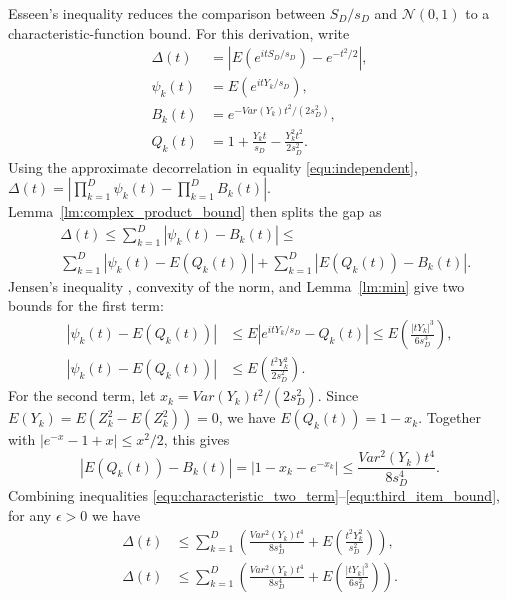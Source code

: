 Esseen's inequality reduces the comparison between $S_D/s_D$ and $\mathcal{N}(0,1)$ to a characteristic-function bound. For this derivation, write
\begin{align}
\Delta(t)&=\left|E(e^{itS_D/s_D})-e^{-t^2/2}\right|,\label{equ:delta_notation}\\
\psi_k(t)&=E(e^{itY_k/s_D}),\label{equ:psi_k_notation}\\
B_k(t)&=e^{-Var(Y_k)t^2/(2s_D^2)},\label{equ:Bk_notation}\\
Q_k(t)&=1+\frac{Y_kt}{s_D}-\frac{Y_k^2t^2}{2s_D^2}.\label{equ:Qk_notation}
\end{align}
Using the approximate decorrelation in equality \ref{equ:independent}, $\Delta(t)=|\prod_{k=1}^{D}\psi_k(t)-\prod_{k=1}^{D}B_k(t)|$. Lemma~\ref{lm:complex_product_bound} then splits the gap as
\begin{equation}
\begin{aligned}
&\Delta(t)\leq \sum_{k=1}^{D}|\psi_k(t)-B_k(t)| \leq {}\\
&\sum_{k=1}^{D}|\psi_k(t)-E(Q_k(t))|
+\sum_{k=1}^{D}|E(Q_k(t))-B_k(t)|.
\end{aligned}
\label{equ:characteristic_two_term}
\end{equation}
Jensen's inequality \cite{mcshane1937jensen}, convexity of the norm, and Lemma~\ref{lm:min} give two bounds for the first term:
\begin{align}
|\psi_k(t)-E(Q_k(t))|
&\leq E|e^{itY_k/s_D}-Q_k(t)|
\leq E\!\left(\frac{|tY_k|^3}{6s_D^3}\right),
\label{equ:first_item_bound}\\
|\psi_k(t)-E(Q_k(t))|
&\leq E\!\left(\frac{t^2Y_k^2}{2s_D^2}\right).
\label{equ:second_item_bound}
\end{align}
For the second term, let $x_k=Var(Y_k)t^2/(2s_D^2)$. Since $E(Y_k)=E(Z_k^2-E(Z_k^2))=0$, we have $E(Q_k(t))=1-x_k$. Together with $|e^{-x}-1+x|\leq x^2/2$, this gives
\begin{equation}
|E(Q_k(t))-B_k(t)|
=|1-x_k-e^{-x_k}|
\leq \frac{Var^2(Y_k)t^4}{8s_D^4}.
\label{equ:third_item_bound}
\end{equation}
Combining inequalities \ref{equ:characteristic_two_term}--\ref{equ:third_item_bound}, for any $\epsilon>0$ we have
\begin{align}
\Delta(t)
&\leq
\sum_{k=1}^{D}\left(
\frac{Var^2(Y_k)t^4}{8s_D^4}
+E\!\left(\frac{t^2Y_k^2}{s_D^2}\right)
\right),
\label{equ:inequ_1}\\
\Delta(t)
&\leq
\sum_{k=1}^{D}\left(
\frac{Var^2(Y_k)t^4}{8s_D^4}
+E\!\left(\frac{|tY_k|^3}{6s_D^2}\right)
\right).
\label{equ:inequ_2}
\end{align}
